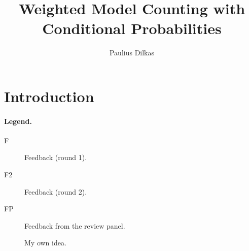 \documentclass{article}
\title{Weighted Model Counting with Conditional Probabilities}
\author{Paulius Dilkas}
\theoremstyle{definition}
\theoremstyle{remark}
\begin{document}
\maketitle

\section{Introduction}

\paragraph{Legend.}
\begin{description}
\item[F] Feedback (round 1).
\item[F2] Feedback (round 2).
\item[FP] Feedback from the review panel.
\item[\textbullet] My own idea.
\end{description}
\end{document}
